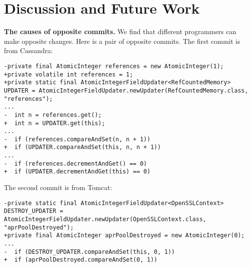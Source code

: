 \section{Discussion and Future Work}
%
%
%
%
%
%
%
%

\noindent
\textbf{The causes of opposite commits.} We find that different programmers can make opposite changes. Here is a pair of opposite commits. The first commit is from Cassandra:

\begin{lstlisting}
-private final AtomicInteger references = new AtomicInteger(1);
+private volatile int references = 1;
+private static final AtomicIntegerFieldUpdater<RefCountedMemory> UPDATER = AtomicIntegerFieldUpdater.newUpdater(RefCountedMemory.class, "references");
...
-  int n = references.get();
+  int n = UPDATER.get(this);
...
-  if (references.compareAndSet(n, n + 1))
+  if (UPDATER.compareAndSet(this, n, n + 1))
...
-  if (references.decrementAndGet() == 0)
+  if (UPDATER.decrementAndGet(this) == 0)
\end{lstlisting}

The second commit is from Tomcat:

\begin{lstlisting}
-private static final AtomicIntegerFieldUpdater<OpenSSLContext> DESTROY_UPDATER = AtomicIntegerFieldUpdater.newUpdater(OpenSSLContext.class, "aprPoolDestroyed");
+private final AtomicInteger aprPoolDestroyed = new AtomicInteger(0);
...
-  if (DESTROY_UPDATER.compareAndSet(this, 0, 1))
+  if (aprPoolDestroyed.compareAndSet(0, 1))
\end{lstlisting}

